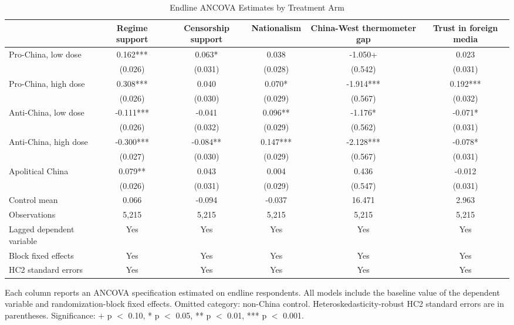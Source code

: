 \begin{table}[H]
\centering
\caption{Endline ANCOVA Estimates by Treatment Arm}
\label{tab:main_ancova_t1}
\footnotesize
\begin{threeparttable}
\begin{tabular}{lccccc}
\toprule
 & Regime support & Censorship support & Nationalism & China-West thermometer gap & Trust in foreign media \\
\midrule
Pro-China, low dose & 0.162*** & 0.063* & 0.038 & -1.050+ & 0.023 \\
 & (0.026) & (0.031) & (0.028) & (0.542) & (0.031) \\
\addlinespace
Pro-China, high dose & 0.308*** & 0.040 & 0.070* & -1.914*** & 0.192*** \\
 & (0.026) & (0.030) & (0.029) & (0.567) & (0.032) \\
\addlinespace
Anti-China, low dose & -0.111*** & -0.041 & 0.096** & -1.176* & -0.071* \\
 & (0.026) & (0.032) & (0.029) & (0.562) & (0.031) \\
\addlinespace
Anti-China, high dose & -0.300*** & -0.084** & 0.147*** & -2.128*** & -0.078* \\
 & (0.027) & (0.030) & (0.029) & (0.567) & (0.031) \\
\addlinespace
Apolitical China & 0.079** & 0.043 & 0.004 & 0.436 & -0.012 \\
 & (0.026) & (0.031) & (0.029) & (0.547) & (0.031) \\
\addlinespace
\midrule
Control mean & 0.066 & -0.094 & -0.037 & 16.471 & 2.963 \\
Observations & 5,215 & 5,215 & 5,215 & 5,215 & 5,215 \\
Lagged dependent variable & Yes & Yes & Yes & Yes & Yes \\
Block fixed effects & Yes & Yes & Yes & Yes & Yes \\
HC2 standard errors & Yes & Yes & Yes & Yes & Yes \\
\bottomrule
\end{tabular}
\begin{tablenotes}[flushleft]
\footnotesize
\item Each column reports an ANCOVA specification estimated on endline respondents. All models include the baseline value of the dependent variable and randomization-block fixed effects. Omitted category: non-China control. Heteroskedasticity-robust HC2 standard errors are in parentheses. Significance: + p $<$ 0.10, * p $<$ 0.05, ** p $<$ 0.01, *** p $<$ 0.001.
\end{tablenotes}
\end{threeparttable}
\end{table}
